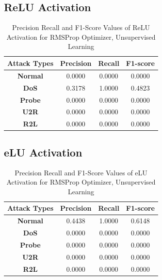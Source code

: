 \documentclass[12pt, a4paper]{report}
\begin{document}
\begin{appendices}
  
  \subsection{ReLU Activation}
  \begin{table}[h]
		\centering
		\captionsetup{justification=centering,margin=2cm}
		\begin{tabular}{|c|c|c|c|}
		\hline
		\textbf{Attack Types} & \textbf{Precision} & \textbf{Recall} & \textbf{F1-score} \\ \hline
		\textbf{Normal}       & 0.0000             & 0.0000          & 0.0000            \\ \hline
		\textbf{DoS}          & 0.3178             & 1.0000          & 0.4823            \\ \hline
		\textbf{Probe}        & 0.0000             & 0.0000          & 0.0000            \\ \hline
		\textbf{U2R}          & 0.0000             & 0.0000          & 0.0000            \\ \hline
		\textbf{R2L}          & 0.0000             & 0.0000          & 0.0000            \\ \hline
		\end{tabular}
		\caption{Precision Recall and F1-Score Values of ReLU Activation for RMSProp Optimizer, Unsupervised Learning}
		\label{classification ReLU RMSProp tf}
		\end{table} 

   \subsection{eLU Activation}
  \begin{table}[h]
		\centering
		\captionsetup{justification=centering,margin=2cm}
		\begin{tabular}{|c|c|c|c|}
		\hline
		\textbf{Attack Types} & \textbf{Precision} & \textbf{Recall} & \textbf{F1-score} \\ \hline
		\textbf{Normal}       & 0.4438             & 1.0000          & 0.6148            \\ \hline
		\textbf{DoS}          & 0.0000             & 0.0000          & 0.0000            \\ \hline
		\textbf{Probe}        & 0.0000             & 0.0000          & 0.0000            \\ \hline
		\textbf{U2R}          & 0.0000             & 0.0000          & 0.0000            \\ \hline
		\textbf{R2L}          & 0.0000             & 0.0000          & 0.0000            \\ \hline
		\end{tabular}
		\caption{Precision Recall and F1-Score Values of eLU Activation for RMSProp Optimizer, Unsupervised Learning}
		\label{classification eLU RMSProp tf}
		\end{table} 
  \clearpage

\end{appendices}
\end{document}
